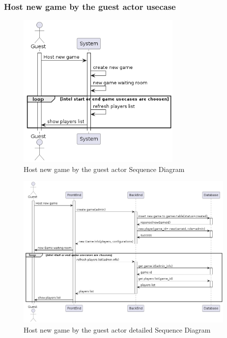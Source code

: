 \documentclass{article}
\begin{document}
\subsubsection{Host new game by the guest actor usecase}
\begin{figure}[H]
	\centering
	\includegraphics[height=3in]{../thesis_tex/assets/diagrams/guest_host_game_SD.png}
	\caption{Host new game by the guest actor Sequence Diagram}
\end{figure}

\begin{figure}[H]
	\centering
	\includegraphics[height=3in]{../thesis_tex/assets/diagrams/guest_host_game_detailedSD.png}
	\caption{Host new game by the guest actor detailed Sequence Diagram}
\end{figure}
\end{document}

